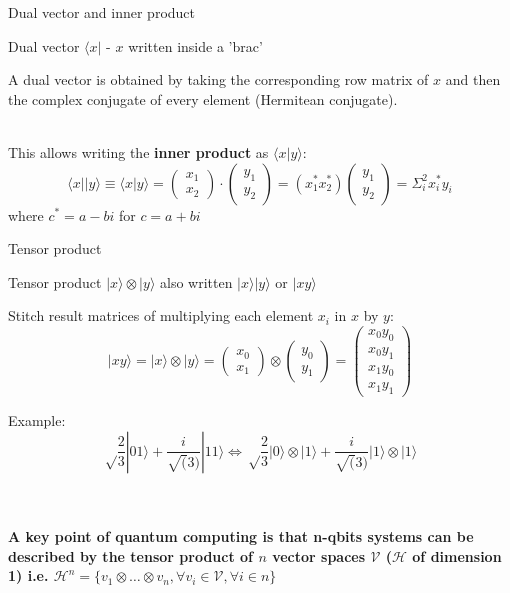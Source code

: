 \documentclass[svgnames,smaller,aspectratio=169]{beamer}
\begin{document}
\begin{frame}[fragile]{Dual vector and inner product}
    \begin{block}{Dual vector}
       $\langle x |$ - $x$ written inside a 'brac'
    \end{block}
  A dual vector is obtained by taking the corresponding row matrix of $x$ and then the complex conjugate of every
  element (Hermitean conjugate). \\~\

  This allows writing the \textbf{inner product} as $\langle x | y \rangle$:
  \begin{equation*}
    \langle x || y \rangle \equiv \langle x | y \rangle = \begin{pmatrix} x_1 \\ x_2 \end{pmatrix}
    \cdot \begin{pmatrix} y_1 \\ y_2 \end{pmatrix} = (x_1^* x_2^*)\begin{pmatrix} y_1 \\ y_2 \end{pmatrix} =
    \Sigma_i^2x_i^* y_i
  \end{equation*}
   where $c^*=a-bi$  for $c=a+bi$
\end{frame}



\begin{frame}[fragile]{Tensor product}
  \begin{block}{Tensor product}
   $|x\rangle\otimes|y\rangle$ also written $|x\rangle|y\rangle$ or $|xy\rangle$
  \end{block}
  Stitch result matrices of multiplying each element $x_i$ in $x$ by $y$:
$$|xy\rangle = |x\rangle\otimes|y\rangle = \begin{pmatrix} x_0 \\ x_1 \end{pmatrix} \otimes \begin{pmatrix} y_0 \\ y_1 \end{pmatrix}
  = \begin{pmatrix} x_0 y_0 \\ x_0 y_1 \\ x_1 y_0 \\ x_1 y_1 \end{pmatrix}$$
  
Example: $$\sqrt\frac{2}{3}|01\rangle + \frac{i}{\sqrt(3)}|11\rangle \Longleftrightarrow
\sqrt\frac{2}{3}|0\rangle\otimes|1\rangle + \frac{i}{\sqrt(3)}|1\rangle\otimes|1\rangle$$ \\~\

\textbf{A key point of quantum computing is that n-qbits systems can be described by the tensor product of $n$ vector
  spaces $\mathcal{V}$ ($\mathcal{H}$ of dimension 1) i.e. $\mathcal{H}^n = \{ v_1 \otimes \ldots \otimes v_n, \forall v_i \in \mathcal{V}, \forall i \in n \}$}
\end{frame}
\end{document}
